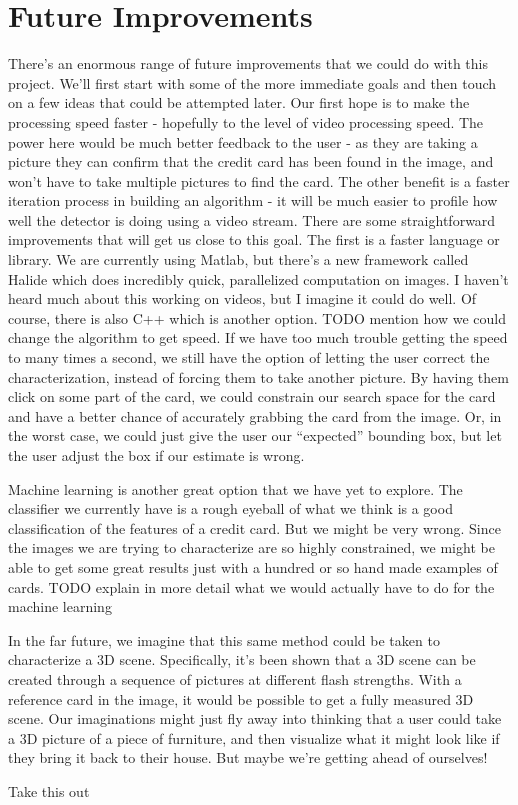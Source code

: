 \documentclass[10pt,twocolumn,letterpaper]{article}
\begin{document}
\section{Future Improvements}
There’s an enormous range of future improvements that we could do with this project. We’ll first start with some of the more immediate goals and then touch on a few ideas that could be attempted later. Our first hope is to make the processing speed faster - hopefully to the level of video processing speed. The power here would be much better feedback to the user - as they are taking a picture they can confirm that the credit card has been found in the image, and won’t have to take multiple pictures to find the card. The other benefit is a faster iteration process in building an algorithm - it will be much easier to profile how well the detector is doing using a video stream. There are some straightforward improvements that will get us close to this goal. The first is a faster language or library. We are currently using Matlab, but there’s a new framework called Halide which does incredibly quick, parallelized computation on images. I haven’t heard much about this working on videos, but I imagine it could do well. Of course, there is also C++ which is another option. TODO mention how we could change the algorithm to get speed.
If we have too much trouble getting the speed to many times a second, we still have the option of letting the user correct the characterization, instead of forcing them to take another picture. By having them click on some part of the card, we could constrain our search space for the card and have a better chance of accurately grabbing the card from the image. Or, in the worst case, we could just give the user our “expected” bounding box, but let the user adjust the box if our estimate is wrong.

Machine learning is another great option that we have yet to explore. The classifier we currently have is a rough eyeball of what we think is a good classification of the features of a credit card. But we might be very wrong. Since the images we are trying to characterize are so highly constrained, we might be able to get some great results just with a hundred or so hand made examples of cards. TODO explain in more detail what we would actually have to do for the machine learning

In the far future, we imagine that this same method could be taken to characterize a 3D scene. Specifically, it’s been shown that a 3D scene can be created through a sequence of pictures at different flash strengths. With a reference card in the image, it would be possible to get a fully measured 3D scene. Our imaginations might just fly away into thinking that a user could take a 3D picture of a piece of furniture, and then visualize what it might look like if they bring it back to their house. But maybe we’re getting ahead of ourselves!

Take this out \cite{Authors13}





{\small


}
\end{document}
